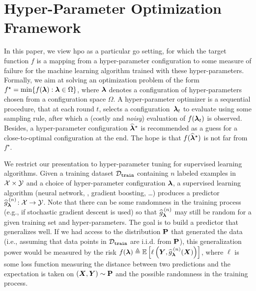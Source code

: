 \section{Hyper-Parameter Optimization Framework}\label{sec:dttts.framework}

In this paper, we view \gls{hpo} as a particular \gls{go} setting, for which the target function $f$ is a mapping from a hyper-parameter configuration to some measure of failure for the machine learning algorithm trained with these hyper-parameters. Formally, we aim at solving an optimization problem of the form $f^\star = \min \{f({\boldsymbol \lambda}):{\boldsymbol \lambda}\in\Omega\}$, where ${\boldsymbol \lambda}$ denotes a configuration of hyper-parameters chosen from a configuration space $\Omega$. A hyper-parameter optimizer is a sequential procedure, that at each round $t$, selects a configuration~${\boldsymbol \lambda}_t$ to evaluate using some sampling rule, after which a (costly and \emph{noisy}) evaluation of $f({\boldsymbol \lambda}_t)$ is observed. Besides, a hyper-parameter configuration $\widehat{{\boldsymbol \lambda}}^\star$ is recommended as a guess for a close-to-optimal configuration at the end. The hope is that $f(\widehat{{\boldsymbol \lambda}}^\star)$ is not far from $f^\star$.

We restrict our presentation to hyper-parameter tuning for supervised learning algorithms. Given a training dataset $\mathcal{D}_{\texttt{train}}$ containing $n$ labeled examples in $\mathcal{X} \times \mathcal{Y}$ and a choice of hyper-parameter configuration ${\boldsymbol \lambda}$, a supervised learning algorithm (neural network, \SVM, gradient boosting, \dots) produces a predictor $\widehat{g}_{\bm\lambda}^{\,(n)}\!:\mathcal{X} \rightarrow \mathcal{Y}$. Note that there can be some randomness in the training process (e.g., if stochastic gradient descent is used) so that $\widehat{g}_{{\boldsymbol \lambda}}^{\,(n)}$ may still be random for a given training set and hyper-parameters. The goal is to build a predictor that generalizes well. If we had access to the distribution ${\bf P}$ that generated the data (i.e., assuming that data points in $\mathcal{D}_{\texttt{train}}$ are i.i.d. from ${\bf P}$), this generalization power would be measured by the risk $f(\bm\lambda) \triangleq \mathbb{E}\left[\ell\left(\bm Y,\widehat g_{{\boldsymbol \lambda}}^{\,(n)}(\bm X)\right) \right]$, where $\ell$ is some loss function measuring the distance between two predictions and the expectation is taken on $(\bm X , \bm Y) \sim {\bf P}$ and the possible randomness in the training process. 


